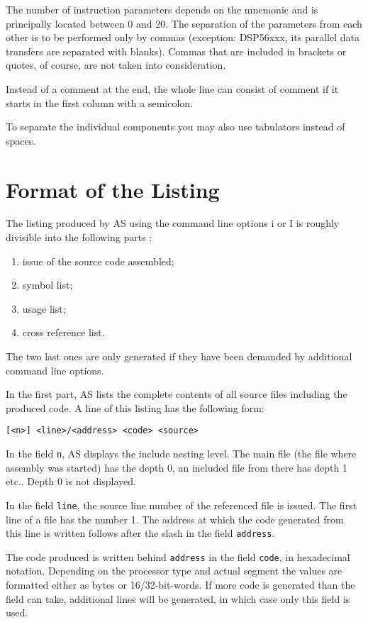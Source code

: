 \documentclass[12pt,twoside]{report}
\newcommand{\tty}[1]{{\tt #1}}
\begin{document}
The number of instruction parameters depends on the mnemonic and is
principally located between 0 and 20.  The separation of the parameters
from each other is to be performed only by commas (exception: DSP56xxx,
its parallel data transfers are separated with blanks).  Commas that
are included in brackets or quotes, of course, are not taken into
consideration.

Instead of a comment at the end, the whole line can consist of
comment if it starts in the first column with a semicolon.

To separate the individual components you may also use tabulators
instead of spaces.


\section{Format of the Listing}

The listing produced by AS using the command line options i or I is
roughly divisible into the following parts :
\begin{enumerate}
\item{issue of the source code assembled;}
\item{symbol list;}
\item{usage list;}
\item{cross reference list.}
\end{enumerate}
The two last ones are only generated if they have been demanded by
additional command line options.

In the first part, AS lists the complete contents of all source files
including the produced code.  A line of this listing has the following
form:
\begin{verbatim}
[<n>] <line>/<address> <code> <source>
\end{verbatim}
In the field \tty{n}, AS displays the include nesting level.  The main file
(the file where assembly was started) has the depth 0, an included
file from there has depth 1 etc..  Depth 0 is not displayed.

In the field \tty{line}, the source line number of the referenced file is
issued. The first line of a file has the number 1.  The address at
which the code generated from this line is written follows after the
slash in the field \tty{address}.

The code produced is written behind \tty{address} in the field \tty{code},
in hexadecimal notation. Depending on the processor type and actual
segment the values are formatted either as bytes or 16/32-bit-words.
If more code is generated than the field can take, additional lines
will be  generated, in which case only this field is used.
\end{document}
